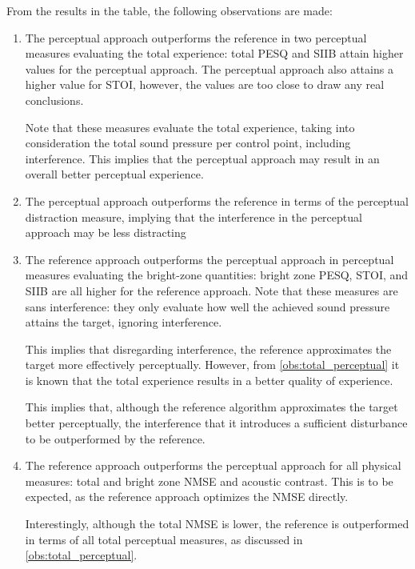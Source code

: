 From the results in the table, the following observations are made:
\begin{enumerate}
    \item The perceptual approach outperforms the reference in two perceptual measures evaluating the total experience:
        total PESQ and SIIB attain higher values for the perceptual approach.
        The perceptual approach also attains a higher value for STOI, 
        however, the values are too close to draw any real conclusions. 

        Note that these measures evaluate the total experience, taking into consideration the total 
        sound pressure per control point, including interference.
        This implies that the perceptual approach may result in an overall better perceptual experience.
        \label{obs:total_perceptual}

    \item The perceptual approach outperforms the reference in terms of the perceptual distraction measure,
        implying that the interference in the perceptual approach may be less distracting 
        \label{obs:distraction}

    \item The reference approach outperforms the perceptual approach in perceptual measures evaluating the bright-zone quantities: bright zone PESQ, STOI, and SIIB are all higher for the reference approach.
        Note that these measures are sans interference: they only evaluate how well the achieved sound pressure attains the target, ignoring interference.

        This implies that disregarding interference, the reference approximates the target more effectively 
        perceptually.
        However, from \autoref{obs:total_perceptual} it is known that the total experience results in a 
        better quality of experience. 

        This implies that, although the reference algorithm approximates the target better perceptually, 
        the interference that it introduces a sufficient disturbance to be outperformed by the reference.
        \label{obs:bright_zone_perceptual}

    \item The reference approach outperforms the perceptual approach for all physical measures: 
        total and bright zone NMSE and acoustic contrast.
        This is to be expected, as the reference approach optimizes the NMSE directly.

        Interestingly, although the total NMSE is lower, the reference is outperformed in terms of all total perceptual 
        measures, as discussed in \autoref{obs:total_perceptual}.


\end{enumerate}
